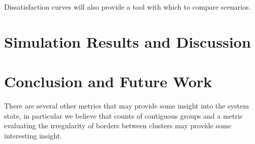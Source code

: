 \documentclass[sigplan,nonacm]{acmart}
\begin{document}
Dissatisfaction curves will also provide a tool with which to compare scenarios.

\section{Simulation Results and Discussion}



\section{Conclusion and Future Work}



There are several other metrics that may provide some insight into the system state, in particular we believe that 
counts of contiguous groups and a metric evaluating the irregularity of borders between clusters may provide some interesting insight.



\end{document}
